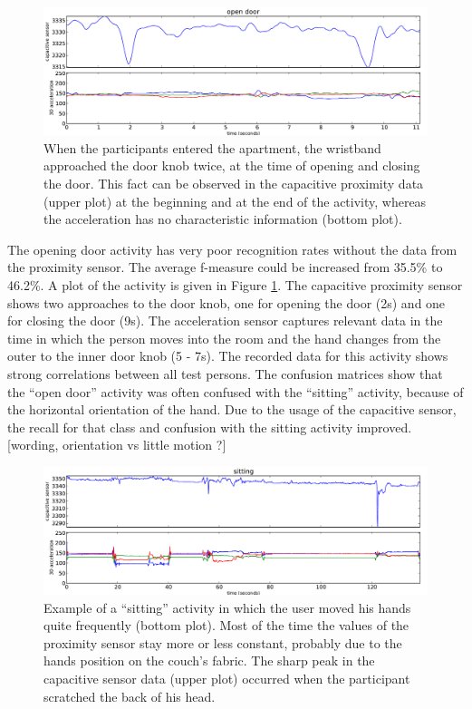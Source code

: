 \documentclass[runningheads,a4paper]{llncs}
\begin{document}
\begin{figure}
	\centering
		\includegraphics[width=1.00\textwidth]{../Auswertung/images/tobias_1.pdf}
	\caption{When the participants entered the apartment, the wristband approached the door knob twice, at the time of opening and closing the door. This fact can be observed in the capacitive proximity data (upper plot) at the beginning and at the end of the activity, whereas the acceleration has no characteristic information (bottom plot).}
	\label{fig:opendoor}
\end{figure}

The opening door activity has very poor recognition rates without the data from the proximity sensor. The average f-measure could be increased from 35.5\% to 46.2\%. A plot of the activity is given in Figure \ref{fig:opendoor}. The capacitive proximity sensor shows two approaches to the door knob, one for opening the door (2s) and one for closing the door (9s). The acceleration sensor captures relevant data in the time in which the person moves into the room and the hand changes from the outer to the inner door knob (5 - 7s). The recorded data for this activity shows strong correlations between all test persons. The confusion matrices show that the ``open door'' activity was often confused with the ``sitting'' activity, because of the horizontal orientation of the hand. Due to the usage of the capacitive sensor, the recall for that class and confusion with the sitting activity improved. [wording, orientation vs little motion ?]

\begin{figure}
	\centering
		\includegraphics[width=1.00\textwidth]{../Auswertung/images/eugen_2.pdf}
	\caption{Example of a ``sitting'' activity in which the user moved his hands quite frequently (bottom plot). Most of the time the values of the proximity sensor stay more or less constant, probably due to the hands position on the couch's fabric. The sharp peak in the capacitive sensor data (upper plot) occurred when the participant scratched the back of his head. }
	\label{fig:sitting}
\end{figure}
\end{document}

